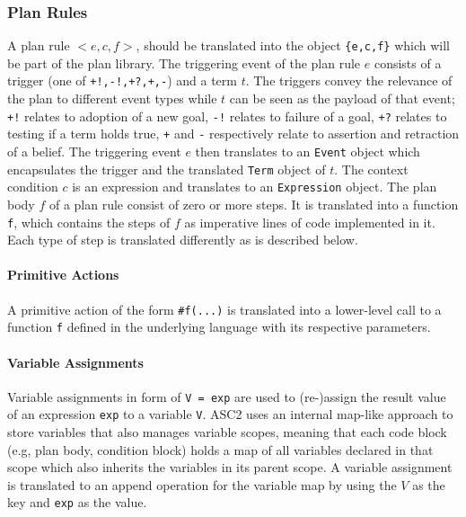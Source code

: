 \subsubsection{Plan Rules}
A plan rule $<e,c,f>$, should be translated into the object \verb+{e,c,f}+ which will be part of the plan library. The triggering event of the plan rule $e$ consists of a trigger (one of \verb#+!,-!,+?,+,-#) and a term $t$. The triggers convey the relevance of the plan to different event types while $t$ can be seen as the payload of that event; \verb#+!# relates to adoption of a new goal, \verb#-!# relates to failure of a goal, \verb#+?# relates to testing if a term holds true, \verb#+# and \verb#-# respectively relate to assertion and retraction of a belief. The triggering event $e$ then translates to an \verb+Event+ object which encapsulates the trigger and the translated \verb+Term+ object of $t$. The context condition $c$ is an expression and translates to an \verb+Expression+ object. The plan body $f$ of a plan rule consist of zero or more steps. %
It is translated into a function \verb+f+, which contains the steps of $f$ as imperative lines of code implemented in it. Each type of step is translated differently as is described below.

\paragraph{Primitive Actions}
A primitive action of the form \verb+#f(...)+ %
is translated into a lower-level call to a function \verb+f+ defined in the underlying language with its respective parameters. %

\paragraph{Variable Assignments}
Variable assignments in form of \verb+V = exp+ are used to (re-)assign the result value of an expression \verb+exp+ to a variable \verb+V+. ASC2 uses an internal map-like approach to store variables that also manages variable scopes, meaning that each code block (e.g, plan body, condition block) holds a map of all variables declared in that scope which also inherits the variables in its parent scope. A variable assignment is translated to an append operation for the variable map by using the $V$ as the key and \verb+exp+ as the value.


